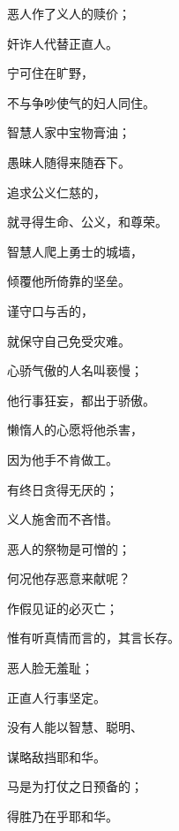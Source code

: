 {\par }{\Q {}恶人作了义人的赎价；
\par }{\Q 奸诈人代替正直人。
\par }{\Q {}宁可住在旷野，
\par }{\Q 不与争吵使气的妇人同住。
\par }{\Q {}智慧人家中{}宝物膏油；
\par }{\Q 愚昧人随得来随吞下。
\par }{\Q {}追求公义仁慈的，
\par }{\Q 就寻得生命、公义，和尊荣。
\par }{\Q {}智慧人爬上勇士的城墙，
\par }{\Q 倾覆他所倚靠的坚垒。
\par }{\Q {}谨守口与舌的，
\par }{\Q 就保守自己免受灾难。
\par }{\Q {}心骄气傲的人名叫亵慢；
\par }{\Q 他行事狂妄，都出于骄傲。
\par }{\Q {}懒惰人的心愿将他杀害，
\par }{\Q 因为他手不肯做工。
\par }{\Q {}有终日贪得无厌的；
\par }{\Q 义人施舍而不吝惜。
\par }{\Q {}恶人的祭物是可憎的；
\par }{\Q 何况他存恶意来献呢？
\par }{\Q {}作假见证的必灭亡；
\par }{\Q 惟有听真情而言的，其言长存。
\par }{\Q {}恶人脸无羞耻；
\par }{\Q 正直人行事坚定。
\par }{\Q {}没有人能以智慧、聪明、
\par }{\Q 谋略敌挡耶和华。
\par }{\Q {}马是为打仗之日预备的；
\par }{\Q 得胜乃在乎耶和华。

}

